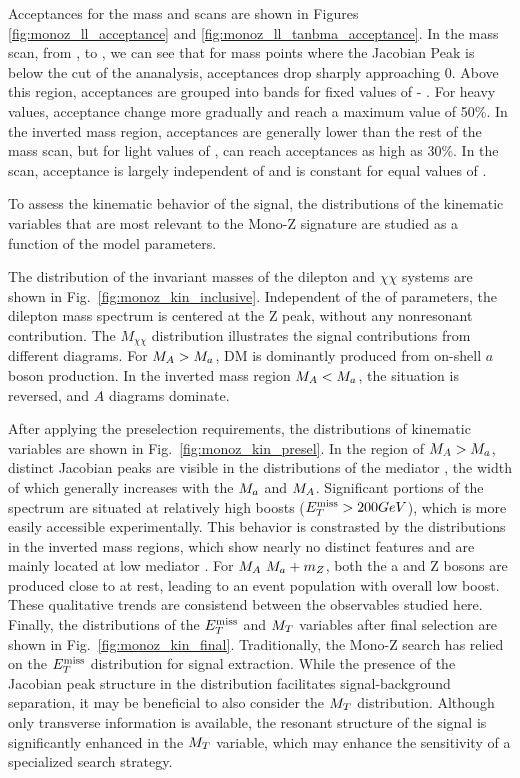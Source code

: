 Acceptances for the mass and \tanb scans are shown in Figures \ref{fig:monoz_ll_acceptance} and \ref{fig:monoz_ll_tanbma_acceptance}.  
In the mass scan, from ,  to ,  we can see that for mass points where the Jacobian Peak is below the \MET cut of the ananalysis, acceptances drop sharply approaching 0.  Above this region, acceptances are grouped into bands for fixed values of \mA - \ma.  For heavy \mA values, acceptance change more gradually and reach a maximum value of 50\%.  In the inverted mass region, acceptances are generally lower than the rest of the mass scan, but for light values of \mA, can reach acceptances as high as 30\%.  In the \tanb scan, acceptance is largely independent of \tanb and is constant for equal values of \ma.  

To assess the kinematic behavior of the signal, the distributions of the kinematic variables that are most relevant to the Mono-Z signature are studied as a function of the model parameters.

The distribution of the invariant masses of the dilepton and $\chi\chi$ systems are shown in Fig.~\ref{fig:monoz_kin_inclusive}. Independent of the of parameters, the dilepton mass spectrum is centered at the Z peak, without any nonresonant contribution. The $M_{\chi\chi}$ distribution illustrates the signal contributions from different diagrams. For $M_{A}>M_{a}$, DM is dominantly produced from on-shell $a$ boson production. In the inverted mass region $M_{A}<M_{a}$, the situation is reversed, and $A$ diagrams dominate.

After applying the preselection requirements, the distributions of kinematic variables are shown in Fig.~\ref{fig:monoz_kin_presel}. In the region of $M_{A}>M_{a}$, distinct Jacobian peaks are visible in the distributions of the mediator \pt, the width of which generally increases with the $M_{a}$ and $M_{A}$. Significant portions of the spectrum are situated at relatively high boosts ($E_T^\mathrm{miss}>200 GeV$), which is more easily accessible experimentally.
This behavior is constrasted by the distributions in the inverted mass regions, which show nearly no distinct features and are mainly located at low mediator \pt. For $M_{A}~M_{a}+m_{Z}$, both the a and Z bosons are produced close to at rest, leading to an event population with overall low boost. These qualitative trends are consistend between the observables studied here.
Finally, the distributions of the $E_T^\mathrm{miss}$ and $M_{T}$ variables after final selection are shown in Fig.~\ref{fig:monoz_kin_final}. Traditionally, the Mono-Z search has relied on the $E_T^\mathrm{miss}$ distribution for signal extraction. While the presence of the Jacobian peak structure in the distribution facilitates signal-background separation, it may be beneficial to also consider the $M_{T}$ distribution. Although only transverse information is available, the resonant structure of the signal is significantly enhanced in the $M_{T}$ variable, which may enhance the sensitivity of a specialized search strategy.

